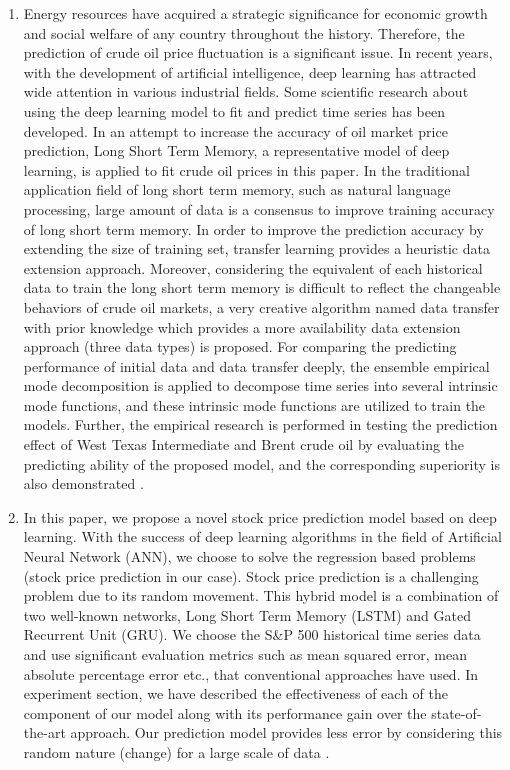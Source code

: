 \documentclass[12pt,journal,compsoc]{IEEEtran}
\begin{document}
\begin{enumerate}
	\item Energy resources have acquired a strategic significance for economic growth and social welfare of any country throughout the history. Therefore, the prediction of crude oil price fluctuation is a significant issue. In recent years, with the development of artificial intelligence, deep learning has attracted wide attention in various industrial fields. Some scientific research about using the deep learning model to fit and predict time series has been developed. In an attempt to increase the accuracy of oil market price prediction, Long Short Term Memory, a representative model of deep learning, is applied to fit crude oil prices in this paper. In the traditional application field of long short term memory, such as natural language processing, large amount of data is a consensus to improve training accuracy of long short term memory. In order to improve the prediction accuracy by extending the size of training set, transfer learning provides a heuristic data extension approach. Moreover, considering the equivalent of each historical data to train the long short term memory is difficult to reflect the changeable behaviors of crude oil markets, a very creative algorithm named data transfer with prior knowledge which provides a more availability data extension approach (three data types) is proposed. For comparing the predicting performance of initial data and data transfer deeply, the ensemble empirical mode decomposition is applied to decompose time series into several intrinsic mode functions, and these intrinsic mode functions are utilized to train the models. Further, the empirical research is performed in testing the prediction effect of West Texas Intermediate and Brent crude oil by evaluating the predicting ability of the proposed model, and the corresponding superiority is also demonstrated \cite{cen2019crude}.
	
	\item In this paper, we propose a novel stock price prediction model based on deep learning. With the success of deep learning algorithms in the field of Artificial Neural Network (ANN), we choose to solve the regression based problems (stock price prediction in our case). Stock price prediction is a challenging problem due to its random movement. This hybrid model is a combination of two well-known networks, Long Short Term Memory (LSTM) and Gated Recurrent Unit (GRU). We choose the S\&P 500 historical time series data and use significant evaluation metrics such as mean squared error, mean absolute percentage error etc., that conventional approaches have used. In experiment section, we have described the effectiveness of each of the component of our model along with its performance gain over the state-of-the-art approach. Our prediction model provides less error by considering this random nature (change) for a large scale of data \cite{hossain2018hybrid}.
	
	
	
\end{enumerate}
\end{document}
